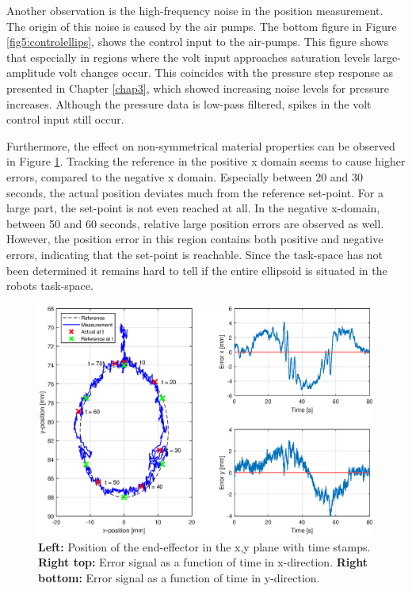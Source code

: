 Another observation is the high-frequency noise in the position measurement. The origin of this noise is caused by the air pumps. 
The bottom figure in Figure \ref{fig5:controlellips}, shows the control input to the air-pumps. This figure shows that especially in regions where the volt input approaches saturation levels large-amplitude volt changes occur. This coincides with the pressure step response as presented in Chapter \ref{chap3}, which showed increasing noise levels for pressure increases. Although the pressure data is low-pass filtered, spikes in the volt control input still occur. 

Furthermore, the effect on non-symmetrical material properties can be observed in Figure \ref{fig5:errorellips}. Tracking the reference in the positive x domain seems to cause higher errors, compared to the negative x domain. Especially between 20 and 30 seconds, the actual position deviates much from the reference set-point. For a large part, the set-point is not even reached at all. In the negative x-domain, between 50 and 60 seconds, relative large position errors are observed as well. However, the position error in this region contains both positive and negative errors, indicating that the set-point is reachable. Since the task-space has not been determined it remains hard to tell if the entire ellipsoid is situated in the robots task-space. 
\newpage

\begin{figure}[H]
    \centering
    \includegraphics[width = \textwidth]{Figures/Chapter5/error.eps}
    \caption{\textbf{Left:} Position of the end-effector in the x,y plane with time stamps. \textbf{Right top:} Error signal as a function of time in x-direction. \textbf{Right bottom:} Error signal as a function of time in y-direction.}
    \label{fig5:errorellips}
\end{figure}


